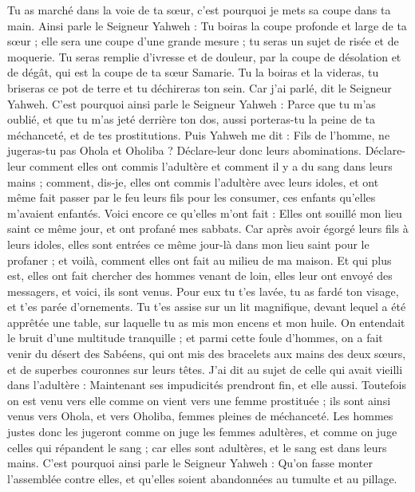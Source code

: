 \begin{multicols}{2}
Tu as marché dans la voie de ta sœur, c'est pourquoi je mets sa coupe dans ta main.
Ainsi parle le Seigneur Yahweh : Tu boiras la coupe profonde et large de ta sœur ; elle sera une coupe d'une grande mesure ; tu seras un sujet de risée et de moquerie.
Tu seras remplie d'ivresse et de douleur, par la coupe de désolation et de dégât, qui est la coupe de ta sœur Samarie.
Tu la boiras et la videras, tu briseras ce pot de terre et tu déchireras ton sein. Car j'ai parlé, dit le Seigneur Yahweh.
C'est pourquoi ainsi parle le Seigneur Yahweh : Parce que tu m'as oublié, et que tu m'as jeté derrière ton dos, aussi porteras-tu la peine de ta méchanceté, et de tes prostitutions.
Puis Yahweh me dit : Fils de l'homme, ne jugeras-tu pas Ohola et Oholiba ? Déclare-leur donc leurs abominations.
Déclare-leur comment elles ont commis l'adultère et comment il y a du sang dans leurs mains ; comment, dis-je, elles ont commis l'adultère avec leurs idoles, et ont même fait passer par le feu leurs fils pour les consumer, ces enfants qu'elles m'avaient enfantés.
Voici encore ce qu'elles m'ont fait : Elles ont souillé mon lieu saint ce même jour, et ont profané mes sabbats.
Car après avoir égorgé leurs fils à leurs idoles, elles sont entrées ce même jour-là dans mon lieu saint pour le profaner ; et voilà, comment elles ont fait au milieu de ma maison.
Et qui plus est, elles ont fait chercher des hommes venant de loin, elles leur ont envoyé des messagers, et voici, ils sont venus. Pour eux tu t'es lavée, tu as fardé ton visage, et t'es parée d'ornements.
Tu t'es assise sur un lit magnifique, devant lequel a été apprêtée une table, sur laquelle tu as mis mon encens et mon huile.
On entendait le bruit d'une multitude tranquille ; et parmi cette foule d'hommes, on a fait venir du désert des Sabéens, qui ont mis des bracelets aux mains des deux sœurs, et de superbes couronnes sur leurs têtes.
J'ai dit au sujet de celle qui avait vieilli dans l'adultère : Maintenant ses impudicités prendront fin, et elle aussi.
Toutefois on est venu vers elle comme on vient vers une femme prostituée ; ils sont ainsi venus vers Ohola, et vers Oholiba, femmes pleines de méchanceté.
Les hommes justes donc les jugeront comme on juge les femmes adultères, et comme on juge celles qui répandent le sang ; car elles sont adultères, et le sang est dans leurs mains.
C'est pourquoi ainsi parle le Seigneur Yahweh : Qu'on fasse monter l'assemblée contre elles, et qu'elles soient abandonnées au tumulte et au pillage.

\end{multicols}
